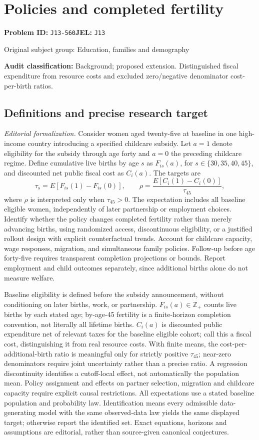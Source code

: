 \documentclass[11pt,a4paper]{article}
\begin{document}
\section*{Policies and completed fertility}
\textbf{Problem ID:} \texttt{J13-560}\quad \textbf{JEL:} \texttt{J13}\par
\label{problem:OP-0456}
{\sffamily\small\color{muted}Original subject group: Education, families and demography\par}
\label{definitions:problem:30007738}
\textbf{Audit classification:} Background; proposed extension. Distinguished fiscal expenditure from resource costs and excluded zero/negative denominator cost-per-birth ratios.
\subsection*{Definitions and precise research target}
\textit{Editorial formalization.} Consider women aged twenty-five at baseline in one high-income country introducing a specified childcare subsidy. Let \(a=1\) denote eligibility for the subsidy through age forty and \(a=0\) the preceding childcare regime. Define cumulative live births by age \(s\) as \(F_{is}(a)\), for \(s\in\{30,35,40,45\}\), and discounted net public fiscal cost as \(C_i(a)\). The targets are
\[\tau_s=E[F_{is}(1)-F_{is}(0)],\qquad\rho=\frac{E[C_i(1)-C_i(0)]}{\tau_{45}},\]
where \(\rho\) is interpreted only when \(\tau_{45}>0\). The expectation includes all baseline eligible women, independently of later partnership or employment choices. Identify whether the policy changes completed fertility rather than merely advancing births, using randomized access, discontinuous eligibility, or a justified rollout design with explicit counterfactual trends. Account for childcare capacity, wage responses, migration, and simultaneous family policies. Follow-up before age forty-five requires transparent completion projections or bounds. Report employment and child outcomes separately, since additional births alone do not measure welfare.

Baseline eligibility is defined before the subsidy announcement, without conditioning on later births, work, or partnership. \(F_{is}(a)\in\mathbb Z_+\) counts live births by each stated age; by-age-45 fertility is a finite-horizon completion convention, not literally all lifetime births. \(C_i(a)\) is discounted public expenditure net of relevant taxes for the baseline eligible cohort; call this a fiscal cost, distinguishing it from real resource costs. With finite means, the cost-per-additional-birth ratio is meaningful only for strictly positive \(\tau_{45}\); near-zero denominators require joint uncertainty rather than a precise ratio. A regression discontinuity identifies a cutoff-local effect, not automatically the population mean. Policy assignment and effects on partner selection, migration and childcare capacity require explicit causal restrictions. All expectations use a stated baseline population and probability law. Identification means every admissible data-generating model with the same observed-data law yields the same displayed target; otherwise report the identified set. Exact equations, horizons and assumptions are editorial, rather than source-given canonical conjectures.
\end{document}
